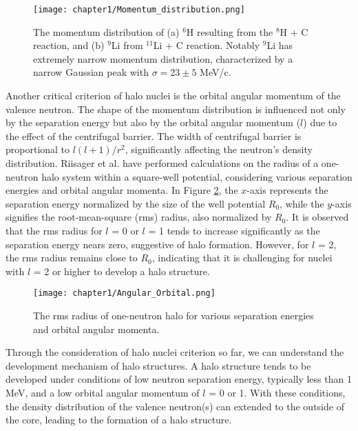 \begin{figure}
    \centering
    \texttt{[image: chapter1/Momentum\_distribution.png]}
    \caption[The momentum distribution of $^{6}$H and $^{9}$Li]{The momentum distribution of (a) $^{6}$H resulting from the $^{8}$H + C reaction, and (b) $^{9}$Li from $^{11}$Li + C reaction. Notably $^{9}$Li has extremely narrow momentum distribution, characterized by a narrow Gaussian peak with $\sigma  = 23 \pm 5$ MeV/c. \cite{Kobayashi88}}
    \label{fig:Momentum_distribution}
\end{figure}

Another critical criterion of halo nuclei is the orbital angular momentum of the valence neutron. The shape of the momentum distribution is influenced not only by the separation energy but also by the orbital angular momentum ($l$) due to the effect of the centrifugal barrier. The width of centrifugal barrier is proportional to $l(l+1)/r^2$, significantly affecting the neutron's density distribution. Riisager et al. \cite{Riisager} have performed calculations on the radius of a one-neutron halo system within a square-well potential, considering various separation energies and orbital angular momenta. In Figure \ref{fig:Angular_Orbital}, the $x$-axis represents the separation energy normalized by the size of the well potential $R_0$, while the $y$-axis signifies the root-mean-square (rms) radius, also normalized by $R_0$.  It is observed that the rms radius for $l$ = 0 or $l$ = 1 tends to increase significantly as the separation energy nears zero, suggestive of halo formation. However, for $l$ = 2, the rms radius remains close to $R_0$, indicating that it is challenging for nuclei with $l$ = 2 or higher to develop a halo structure.

\begin{figure}
    \centering
    \texttt{[image: chapter1/Angular\_Orbital.png]}
    \caption{The rms radius of one-neutron halo for various separation energies and orbital angular momenta. \cite{Riisager}}
    \label{fig:Angular_Orbital}
\end{figure}

Through the consideration of halo nuclei criterion so far, we can understand the development mechanism of halo structures. A halo structure tends to be developed under conditions of low neutron separation energy, typically less than 1 MeV, and a low orbital angular momentum of $l$ = 0 or 1. With these conditions, the density distribution of the valence neutron(s) can extended to the outside of the core, leading to the formation of a halo structure.

